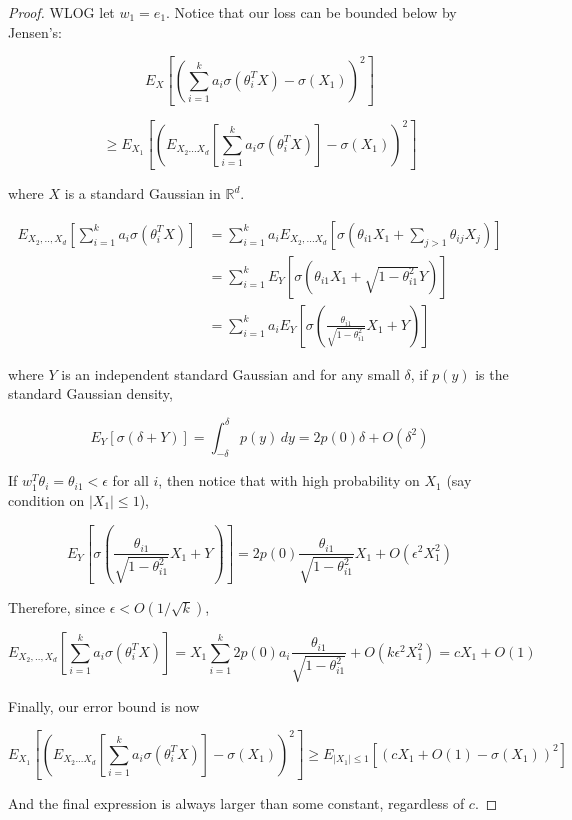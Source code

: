 \documentclass{article}
\newcommand{\R}{{\mathbb{R}}}
\begin{document}
\begin{proof}
WLOG let $w_1 = e_1$. Notice that our loss can be bounded below by Jensen's:

\[E_X \left[ \left( \sum_{i=1}^k a_i \sigma(\theta_i^TX) - \sigma(X_1)\right)^2 \right] \]

\[\geq E_{X_1} \left[ \left( E_{X_2...X_d}\left[ \sum_{i=1}^k a_i \sigma(\theta_i^TX) \right]- \sigma(X_1)\right)^2 \right]
\]

where $X$ is a standard Gaussian in $\R^d$. 

\begin{align*}
E_{X_2,..,X_d} \left[  \sum_{i=1}^k a_i \sigma(\theta_i^TX) \right] &= \sum_{i=1}^k a_i E_{X_2,...X_d}\left[  \sigma(\theta_{i1}X_1 + \sum_{j >1} \theta_{ij}X_{j})  \right]\\
&= \sum_{i=1}^k E_{Y} \left[   \sigma(\theta_{i1}X_1 + \sqrt{1-\theta_{i1}^2}Y)  \right]  \\
&= \sum_{i=1}^k a_i E_{Y} \left[   \sigma(\textstyle\frac{\theta_{i1}}{\sqrt{1-\theta_{i1}^2}}X_1 + Y)  \right] 
\end{align*}

where $Y$ is an independent standard Gaussian and for any small $\delta$, if $p(y)$ is the standard Gaussian density, 

\[ E_Y[\sigma(\delta + Y)] = \int_{-\delta}^{\delta} p(y) \, dy = 2p(0)\delta + O(\delta^2) \]

If $w_1^T\theta_i = \theta_{i1} < \epsilon$ for all $i$, then notice that with high probability on $X_1$ (say condition on $|X_1| \leq 1$), 

\[E_{Y} \left[   \sigma(\textstyle\frac{\theta_{i1}}{\sqrt{1-\theta_{i1}^2}}X_1 + Y)  \right] = 2p(0)\textstyle\frac{\theta_{i1}}{\sqrt{1-\theta_{i1}^2}}X_1 + O(\epsilon^2X_1^2)\]

Therefore, since $\epsilon < O(1/\sqrt{k})$,

\[E_{X_2,..,X_d} \left[  \sum_{i=1}^k a_i \sigma(\theta_i^TX) \right]  = X_1 \sum_{i=1}^k2p(0)a_i\textstyle\frac{\theta_{i1}}{\sqrt{1-\theta_{i1}^2}} + O(k\epsilon^2X_1^2) = cX_1+O(1)\] 


Finally, our error bound is now

\[E_{X_1} \left[ \left( E_{X_2...X_d}\left[ \sum_{i=1}^k a_i \sigma(\theta_i^TX) \right]- \sigma(X_1)\right)^2 \right] \geq E_{|X_1| \leq 1}[(cX_1+O(1) - \sigma(X_1))^2]\]

And the final expression is always larger than some constant, regardless of $c$.
\end{proof}
\end{document}
